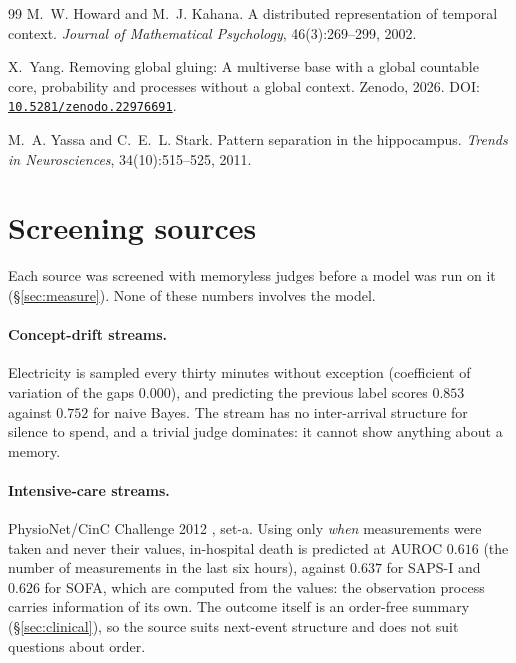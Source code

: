 \documentclass[11pt,a4paper]{article}
\theoremstyle{plain}
\theoremstyle{definition}
\theoremstyle{remark}
\begin{document}
\begin{thebibliography}{99}
M.~W. Howard and M.~J. Kahana.
\newblock A distributed representation of temporal context.
\newblock \emph{Journal of Mathematical Psychology}, 46(3):269--299, 2002.

X.~Yang.
\newblock Removing global gluing: A multiverse base with a global countable
core, probability and processes without a global context.
\newblock Zenodo, 2026.
\newblock DOI:
\href{https://doi.org/10.5281/zenodo.22976691}{\texttt{10.5281/zenodo.22976691}}.

M.~A. Yassa and C.~E.~L. Stark.
\newblock Pattern separation in the hippocampus.
\newblock \emph{Trends in Neurosciences}, 34(10):515--525, 2011.

\end{thebibliography}

\appendix

\section{Screening sources}
\label{app:screens}

Each source was screened with memoryless judges before a model was run on it
(\S\ref{sec:measure}). None of these numbers involves the model.

\paragraph{Concept-drift streams.} Electricity is sampled every thirty minutes
without exception (coefficient of variation of the gaps $0.000$), and predicting
the previous label scores $0.853$ against $0.752$ for naive Bayes. The stream has
no inter-arrival structure for silence to spend, and a trivial judge dominates:
it cannot show anything about a memory.

\paragraph{Intensive-care streams.} PhysioNet/CinC Challenge 2012
\citep{silva2012predicting}, set-a. Using only \emph{when} measurements were
taken and never their values, in-hospital death is predicted at AUROC $0.616$
(the number of measurements in the last six hours), against $0.637$ for SAPS-I
and $0.626$ for SOFA, which are computed from the values: the observation
process carries information of its own. The outcome itself is an order-free
summary (\S\ref{sec:clinical}), so the source suits next-event structure and
does not suit questions about order.
\end{document}

